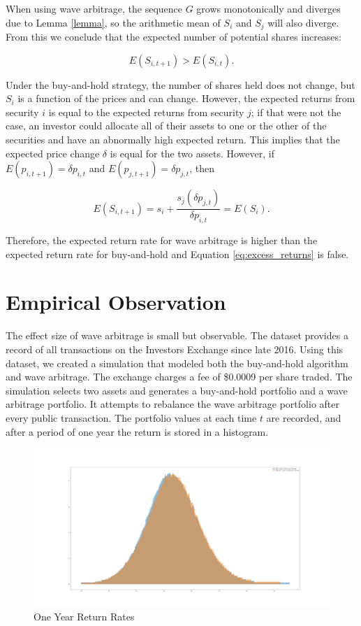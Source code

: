\documentclass{article}
\begin{document}
When using wave arbitrage, the sequence ${G}$ grows monotonically and diverges
due to Lemma \ref{lemma}, so the arithmetic mean of $S_i$ and $S_j$ will also
diverge. From this we conclude that the expected number of potential shares
increases:

\begin{equation}
  E(S_{i,t+1}) > E(S_{i,t}).
\end{equation}

Under the buy-and-hold strategy, the number of shares held does not change, but
$S_i$ is a function of the prices and can change. However, the expected returns
from security $i$ is equal to the expected returns from security $j$; if that
were not the case, an investor could allocate all of their assets to one or the
other of the securities and have an abnormally high expected return. This
implies that the expected price change $\delta$ is equal for the two assets.
However, if $E (p_{i,t+1}) = \delta p_{i,t}$ and $E (p_{j,t+1}) = \delta
p_{j,t}$, then

\begin{equation}
  E (S_{i,t+1}) = s_i + \frac{s_j (\delta p_{j,t})}{\delta p_{i,t}} = E (S_{i}).
\end{equation}

Therefore, the expected return rate for wave arbitrage is higher than the
expected return rate for buy-and-hold and Equation \ref{eq:excess_returns} is
false.

\section{Empirical Observation}

The effect size of wave arbitrage is small but observable. The \citet{IEX}
dataset provides a record of all transactions on the Investors Exchange since
late 2016. Using this dataset, we created a simulation that modeled both the
buy-and-hold algorithm and wave arbitrage. The exchange charges a fee of
\$0.0009 per share traded. The simulation selects two assets and generates a
buy-and-hold portfolio and a wave arbitrage portfolio. It attempts to rebalance
the wave arbitrage portfolio after every public transaction. The portfolio
values at each time $t$ are recorded, and after a period of one year the return
is stored in a histogram.

\begin{figure}[h!]
  \includegraphics[width=\linewidth]{OneYearReturnRates.png}
  \caption{One Year Return Rates}
  \label{fig}
\end{figure}
\end{document}
